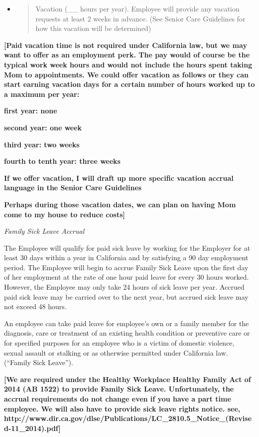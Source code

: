 \documentclass[]{article}
\begin{document}
\begin{itemize}
\item
  \begin{quote}
  Vacation (\_\_ hours per year). Employee will provide any vacation
  requests at least 2 weeks in advance. (See Senior Care Guidelines for
  how this vacation will be determined)
  \end{quote}
\end{itemize}

\textbf{{[}Paid vacation time is not required under California law, but
we may want to offer as an employment perk. The pay would of course be
the typical work week hours and would not include the hours spent taking
Mom to appointments. We could offer vacation as follows or they can
start earning vacation days for a certain number of hours worked up to a
maximum per year: }

\textbf{first year: none}

\textbf{second year: one week}

\textbf{third year: two weeks}

\textbf{fourth to tenth year: three weeks }

\textbf{If we offer vacation, I will draft up more specific vacation
accrual language in the Senior Care Guidelines}

\textbf{Perhaps during those vacation dates, we can plan on having Mom
come to my house to reduce costs{]}}

\emph{Family Sick Leave Accrual}

The Employee will qualify for paid sick leave by working for the
Employer for at least 30 days within a year in California and by
satisfying a 90 day employment period. The Employee will begin to accrue
Family Sick Leave upon the first day of her employment at the rate of
one hour paid leave for every 30 hours worked. However, the Employee may
only take 24 hours of sick leave per year. Accrued paid sick leave may
be carried over to the next year, but accrued sick leave may not exceed
48 hours.

An employee can take paid leave for employee's own or a family member
for the diagnosis, care or treatment of an existing health condition or
preventive care or for specified purposes for an employee who is a
victim of domestic violence, sexual assault or stalking or as otherwise
permitted under California law. (``Family Sick Leave'').

\textbf{{[}We are required under the Healthy Workplace Healthy Family
Act of 2014 (AB 1522) to provide Family Sick Leave. Unfortunately, the
accrual requirements do not change even if you have a part time
employee. We will also have to provide sick leave rights notice. see,
http://www.dir.ca.gov/dlse/Publications/LC\_2810.5\_Notice\_(Revised-11\_2014).pdf{]}}
\end{document}
